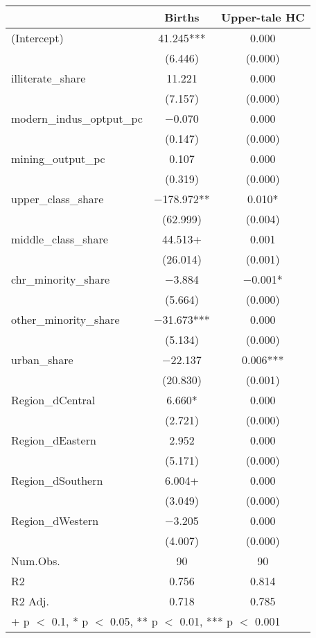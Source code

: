 \begin{table}
\centering
\begin{tabular}[t]{lcc}
\toprule
  & Births & Upper-tale HC\\
\midrule
(Intercept) & \num{41.245}*** & \num{0.000}\\
 & (\num{6.446}) & (\num{0.000})\\
illiterate\_share & \num{11.221} & \num{0.000}\\
 & (\num{7.157}) & (\num{0.000})\\
modern\_indus\_optput\_pc & \num{-0.070} & \num{0.000}\\
 & (\num{0.147}) & (\num{0.000})\\
mining\_output\_pc & \num{0.107} & \num{0.000}\\
 & (\num{0.319}) & (\num{0.000})\\
upper\_class\_share & \num{-178.972}** & \num{0.010}*\\
 & (\num{62.999}) & (\num{0.004})\\
middle\_class\_share & \num{44.513}+ & \num{0.001}\\
 & (\num{26.014}) & (\num{0.001})\\
chr\_minority\_share & \num{-3.884} & \num{-0.001}*\\
 & (\num{5.664}) & (\num{0.000})\\
other\_minority\_share & \num{-31.673}*** & \num{0.000}\\
 & (\num{5.134}) & (\num{0.000})\\
urban\_share & \num{-22.137} & \num{0.006}***\\
 & (\num{20.830}) & (\num{0.001})\\
Region\_dCentral & \num{6.660}* & \num{0.000}\\
 & (\num{2.721}) & (\num{0.000})\\
Region\_dEastern & \num{2.952} & \num{0.000}\\
 & (\num{5.171}) & (\num{0.000})\\
Region\_dSouthern & \num{6.004}+ & \num{0.000}\\
 & (\num{3.049}) & (\num{0.000})\\
Region\_dWestern & \num{-3.205} & \num{0.000}\\
 & (\num{4.007}) & (\num{0.000})\\
\midrule
Num.Obs. & \num{90} & \num{90}\\
R2 & \num{0.756} & \num{0.814}\\
R2 Adj. & \num{0.718} & \num{0.785}\\
\bottomrule
\multicolumn{3}{l}{\rule{0pt}{1em}+ p $<$ 0.1, * p $<$ 0.05, ** p $<$ 0.01, *** p $<$ 0.001}\\
\end{tabular}
\end{table}
